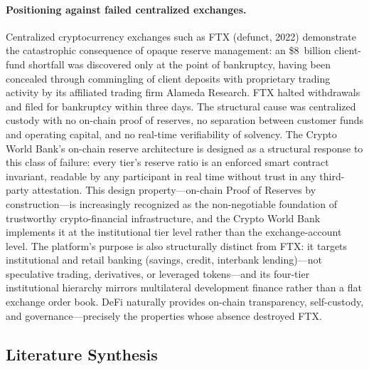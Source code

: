 \documentclass[12pt,a4paper]{report}
\begin{document}
\paragraph{Positioning against failed centralized exchanges.}
Centralized cryptocurrency exchanges such as FTX (defunct, 2022) demonstrate the catastrophic consequence of opaque reserve management: an \$8~billion client-fund shortfall was discovered only at the point of bankruptcy, having been concealed through commingling of client deposits with proprietary trading activity by its affiliated trading firm Alameda Research. FTX halted withdrawals and filed for bankruptcy within three days. The structural cause was centralized custody with no on-chain proof of reserves, no separation between customer funds and operating capital, and no real-time verifiability of solvency. The Crypto World Bank's on-chain reserve architecture is designed as a structural response to this class of failure: every tier's reserve ratio is an enforced smart contract invariant, readable by any participant in real time without trust in any third-party attestation. This design property---on-chain Proof of Reserves by construction---is increasingly recognized as the non-negotiable foundation of trustworthy crypto-financial infrastructure, and the Crypto World Bank implements it at the institutional tier level rather than the exchange-account level. The platform's purpose is also structurally distinct from FTX: it targets institutional and retail banking (savings, credit, interbank lending)---not speculative trading, derivatives, or leveraged tokens---and its four-tier institutional hierarchy mirrors multilateral development finance rather than a flat exchange order book. DeFi naturally provides on-chain transparency, self-custody, and governance---precisely the properties whose absence destroyed FTX.

\subsection{Literature Synthesis}
\end{document}

